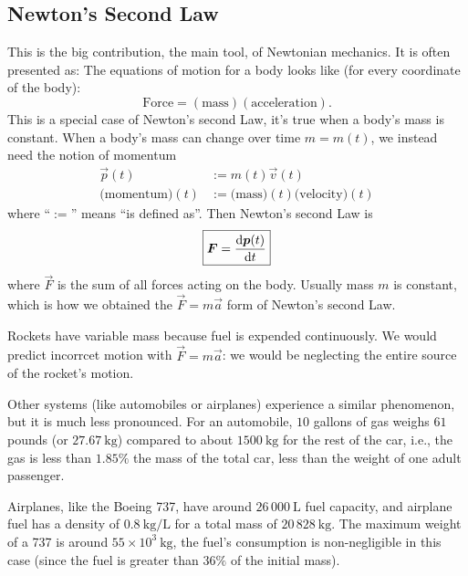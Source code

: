 \subsection{Newton's Second Law}

This is the big contribution, the main tool, of Newtonian mechanics. It
is often presented as: The equations of motion for a body looks like
(for every coordinate of the body):
\begin{equation}
\mbox{Force} = (\mbox{mass})(\mbox{acceleration}).
\end{equation}
This is a special case of Newton's second Law, it's true when a body's
mass is constant. When a body's mass can change over time $m=m(t)$, we
instead need the notion of momentum
\begin{equation}
  \begin{split}
    \vec{p}(t) &:= m(t)\vec{v}(t)\\
    \mbox{(momentum)}(t) &:= \mbox{(mass)}(t)\mbox{(velocity)}(t)
  \end{split}
\end{equation}
where ``$:=$'' means ``is defined as''. Then Newton's second Law is
\begin{equation}
\boxed{\boldsymbol{F} = \frac{\mathrm{d}\boldsymbol{p}(t)}{\mathrm{d} t}}
\end{equation}
where $\vec{F}$ is the sum of all forces acting on the body.
Usually mass $m$ is constant, which is how we obtained the
$\vec{F}=m\vec{a}$ form of Newton's second Law.

\begin{remark}
  Rockets have variable mass because fuel is expended continuously. We
  would predict incorrcet motion with $\vec{F}=m\vec{a}$: we would be neglecting the
  entire source of the rocket's motion.

  Other systems (like automobiles or airplanes) experience a similar
  phenomenon, but it is much less pronounced. For an automobile, $10$
  gallons of gas weighs $61$ pounds (or $27.67~\mathrm{kg}$) compared to
  about $1500~\mathrm{kg}$ for the rest of the car, i.e., the gas is
  less than $1.85\%$ the mass of the total car, less than the weight of one
  adult passenger.

  Airplanes, like the Boeing 737, have around $26\,000~\mathrm{L}$ fuel
  capacity, and airplane fuel has a density of
  $0.8~\mathrm{kg}/\mathrm{L}$ for a total mass of
  $20\,828~\mathrm{kg}$. The maximum weight of a 737 is around
  $55\times10^{3}~\mathrm{kg}$, the fuel's consumption is non-negligible
  in this case (since the fuel is greater than $36\%$ of the initial mass).
\end{remark}

